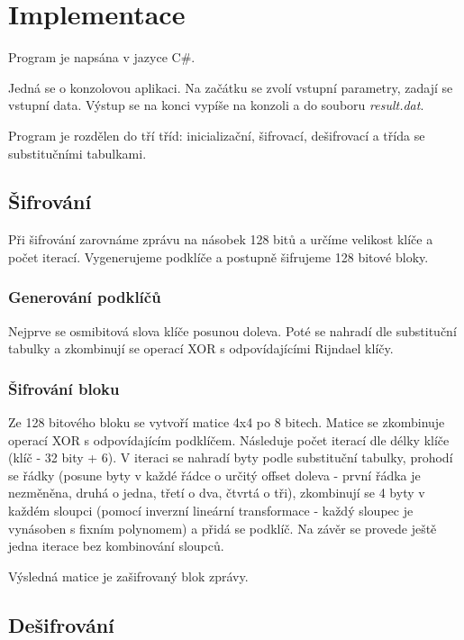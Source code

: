 \setlength{\parskip}{1em}

\chapter{Implementace}

Program je napsána v jazyce C\#.

Jedná se o konzolovou aplikaci. Na začátku se zvolí vstupní parametry, zadají se vstupní data. Výstup se na konci vypíše na konzoli a do souboru \emph{result.dat}.

Program je rozdělen do tří tříd: inicializační, šifrovací, dešifrovací a třída se substitučními tabulkami.


\section{Šifrování}

Při šifrování zarovnáme zprávu na násobek 128 bitů a určíme velikost klíče a počet iterací. Vygenerujeme podklíče a postupně šifrujeme 128 bitové bloky.

\subsection{Generování podklíčů}

Nejprve se osmibitová slova klíče posunou doleva. Poté se nahradí dle substituční tabulky a zkombinují se operací XOR s odpovídajícími Rijndael klíčy.

\subsection{Šifrování bloku}

Ze 128 bitového bloku se vytvoří matice 4x4 po 8 bitech. Matice se zkombinuje operací XOR s odpovídajícím podklíčem. Následuje počet iterací dle délky klíče (klíč - 32 bity + 6). V iteraci se nahradí byty podle substituční tabulky, prohodí se řádky (posune byty v každé řádce o určitý offset doleva - první řádka je nezměněna, druhá o jedna, třetí o dva, čtvrtá o tři), zkombinují se 4 byty v každém sloupci (pomocí inverzní lineární transformace - každý sloupec je vynásoben s fixním polynomem) a přidá se podklíč. Na závěr se provede ještě jedna iterace bez kombinování sloupců.

Výsledná matice je zašifrovaný blok zprávy.


\section{Dešifrování}

